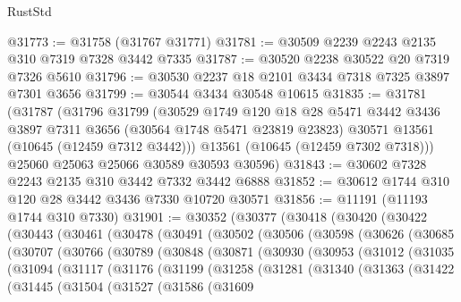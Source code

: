 \begin{lexlean}{RustStd}
\begin{coremodule}
@31773 := @31758 (@31767 @31771)
@31781 := @30509 @2239 @2243 @2135 @310 @7319 @7328 @3442 @7335
@31787 := @30520 @2238 @30522 @20 @7319 @7326 @5610
@31796 := @30530 @2237 @18 @2101 @3434 @7318 @7325 @3897 @7301 @3656
@31799 := @30544 @3434 @30548 @10615
@31835 := @31781
    (@31787
      (@31796
        @31799
        (@30529
          @1749
          @120
          @18
          @28
          @5471
          @3442
          @3436
          @3897
          @7311
          @3656
          (@30564 @1748 @5471 @23819 @23823)
          @30571
          @13561
          (@10645 (@12459 @7312 @3442)))
        @13561
        (@10645 (@12459 @7302 @7318)))
      @25060
      @25063
      @25066
      @30589
      @30593
      @30596)
@31843 := @30602 @7328 @2243 @2135 @310 @3442 @7332 @3442 @6888
@31852 := @30612 @1744 @310 @120 @28 @3442 @3436 @7330 @10720 @30571
@31856 := @11191 (@11193 @1744 @310 @7330)
@31901 := @30352
    (@30377
      (@30418
        (@30420
          (@30422
            (@30443
              (@30461
                (@30478
                  (@30491
                    (@30502
                      (@30506
                        (@30598
                          (@30626
                            (@30685
                              (@30707
                                (@30766
                                  (@30789
                                    (@30848
                                      (@30871
                                        (@30930
                                          (@30953
                                            (@31012
                                              (@31035
                                                (@31094
                                                  (@31117
                                                    (@31176
                                                      (@31199
                                                        (@31258
                                                          (@31281
                                                            (@31340
                                                              (@31363
                                                                (@31422
                                                                  (@31445
                                                                    (@31504
                                                                      (@31527
                                                                        (@31586
                                                                          (@31609

\end{coremodule}
\end{lexlean}
